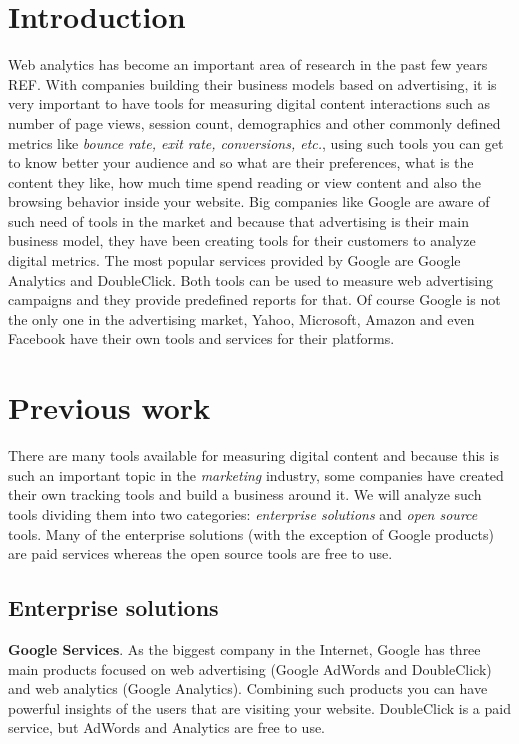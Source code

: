 \documentclass[preprint,12pt,3p]{elsarticle}
\begin{document}
\section{Introduction}
\label{sec:intro}
Web analytics has become an important area of research in the past few years REF. With companies building their business models based on advertising, it is very important to have tools for measuring digital content interactions such as number of page views, session count, demographics and other commonly defined metrics like \textit{bounce rate, exit rate, conversions, etc.}, using such tools you can get to know better your audience and so what are their preferences, what is the content they like, how much time spend reading or view content and also the browsing behavior inside your website.
Big companies like Google are aware of such need of tools in the market and because that advertising is their main business model, they have been creating tools for their customers to analyze digital metrics. The most popular services provided by Google are Google Analytics and DoubleClick. Both tools can be used to measure web advertising campaigns and they provide predefined reports for that. Of course Google is not the only one in the advertising market, Yahoo, Microsoft, Amazon and even Facebook have their own tools and services for their platforms.


\section{Previous work}
\label{sec:background}
There are many tools available for measuring digital content and because this is such an important topic in the \textit{marketing} industry, some companies have created their own tracking tools and build a business around it. We will analyze such tools dividing them into two categories: \textit{enterprise solutions} and \textit{open source} tools. Many of the enterprise solutions (with the exception of Google products) are paid services whereas the open source tools are free to use.


\subsection{Enterprise solutions}
\textbf{Google Services}.
As the biggest company in the Internet, Google has three main products focused on web advertising (Google AdWords and DoubleClick) and web analytics (Google Analytics). Combining such products you can have powerful insights of the users that are visiting your website. DoubleClick is a paid service, but AdWords and Analytics are free to use.
\end{document}
